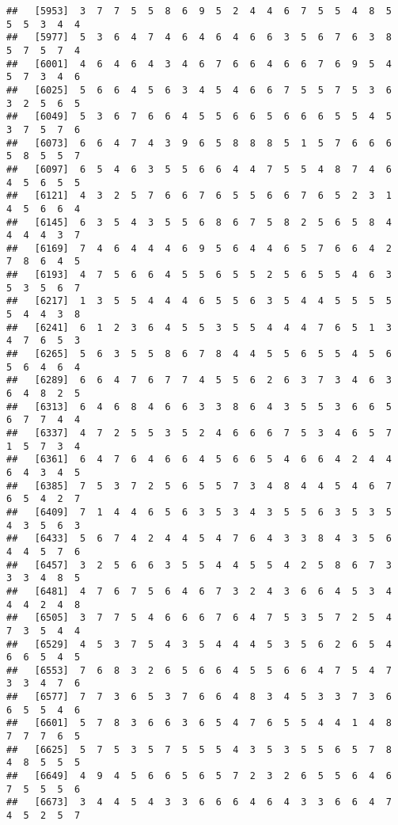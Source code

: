 \documentclass[
]{book}
\begin{document}
\begin{verbatim}
##   [5953]  3  7  7  5  5  8  6  9  5  2  4  4  6  7  5  5  4  8  5  5  5  3  4  4
##   [5977]  5  3  6  4  7  4  6  4  6  4  6  6  3  5  6  7  6  3  8  5  7  5  7  4
##   [6001]  4  6  4  6  4  3  4  6  7  6  6  4  6  6  7  6  9  5  4  5  7  3  4  6
##   [6025]  5  6  6  4  5  6  3  4  5  4  6  6  7  5  5  7  5  3  6  3  2  5  6  5
##   [6049]  5  3  6  7  6  6  4  5  5  6  6  5  6  6  6  5  5  4  5  3  7  5  7  6
##   [6073]  6  6  4  7  4  3  9  6  5  8  8  8  5  1  5  7  6  6  6  5  8  5  5  7
##   [6097]  6  5  4  6  3  5  5  6  6  4  4  7  5  5  4  8  7  4  6  4  5  6  5  5
##   [6121]  4  3  2  5  7  6  6  7  6  5  5  6  6  7  6  5  2  3  1  4  5  6  6  4
##   [6145]  6  3  5  4  3  5  5  6  8  6  7  5  8  2  5  6  5  8  4  4  4  4  3  7
##   [6169]  7  4  6  4  4  4  6  9  5  6  4  4  6  5  7  6  6  4  2  7  8  6  4  5
##   [6193]  4  7  5  6  6  4  5  5  6  5  5  2  5  6  5  5  4  6  3  5  3  5  6  7
##   [6217]  1  3  5  5  4  4  4  6  5  5  6  3  5  4  4  5  5  5  5  5  4  4  3  8
##   [6241]  6  1  2  3  6  4  5  5  3  5  5  4  4  4  7  6  5  1  3  4  7  6  5  3
##   [6265]  5  6  3  5  5  8  6  7  8  4  4  5  5  6  5  5  4  5  6  5  6  4  6  4
##   [6289]  6  6  4  7  6  7  7  4  5  5  6  2  6  3  7  3  4  6  3  6  4  8  2  5
##   [6313]  6  4  6  8  4  6  6  3  3  8  6  4  3  5  5  3  6  6  5  6  7  7  4  4
##   [6337]  4  7  2  5  5  3  5  2  4  6  6  6  7  5  3  4  6  5  7  1  5  7  3  4
##   [6361]  6  4  7  6  4  6  6  4  5  6  6  5  4  6  6  4  2  4  4  6  4  3  4  5
##   [6385]  7  5  3  7  2  5  6  5  5  7  3  4  8  4  4  5  4  6  7  6  5  4  2  7
##   [6409]  7  1  4  4  6  5  6  3  5  3  4  3  5  5  6  3  5  3  5  4  3  5  6  3
##   [6433]  5  6  7  4  2  4  4  5  4  7  6  4  3  3  8  4  3  5  6  4  4  5  7  6
##   [6457]  3  2  5  6  6  3  5  5  4  4  5  5  4  2  5  8  6  7  3  3  3  4  8  5
##   [6481]  4  7  6  7  5  6  4  6  7  3  2  4  3  6  6  4  5  3  4  4  4  2  4  8
##   [6505]  3  7  7  5  4  6  6  6  7  6  4  7  5  3  5  7  2  5  4  7  3  5  4  4
##   [6529]  4  5  3  7  5  4  3  5  4  4  4  5  3  5  6  2  6  5  4  6  6  5  4  5
##   [6553]  7  6  8  3  2  6  5  6  6  4  5  5  6  6  4  7  5  4  7  3  3  4  7  6
##   [6577]  7  7  3  6  5  3  7  6  6  4  8  3  4  5  3  3  7  3  6  6  5  5  4  6
##   [6601]  5  7  8  3  6  6  3  6  5  4  7  6  5  5  4  4  1  4  8  7  7  7  6  5
##   [6625]  5  7  5  3  5  7  5  5  5  4  3  5  3  5  5  6  5  7  8  4  8  5  5  5
##   [6649]  4  9  4  5  6  6  5  6  5  7  2  3  2  6  5  5  6  4  6  7  5  5  5  6
##   [6673]  3  4  4  5  4  3  3  6  6  6  4  6  4  3  3  6  6  4  7  4  5  2  5  7

\end{verbatim}
\end{document}
